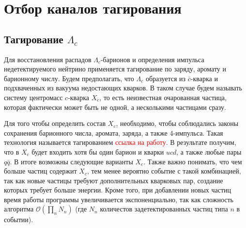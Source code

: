 \section{Отбор каналов тагирования}
\label{taging}
\subsection{Тагирование $\Lambda_c$}

Для восстановления распадов $\Lambda_c$-барионов и определения импульса недетектируемого нейтрино применяется тагирование по заряду, аромату и барионному числу. Будем предполагать, что $\Lambda_c$ образуется из $\bar{c}$-кварка и подхваченных из вакуума недостающих кварков. В таком случае будем называть систему центромасс $c$-кварка $X_c$, то есть неизвестная очарованная частица, которая фактически может быть не одной, а несколькими частицами сразу.

\begin{figure}[h!]
    \centering
\end{figure}

Для того чтобы определить состав $X_c$, необходимо, чтобы соблюдались законы 
сохранения барионного числа, аромата, заряда, а также 4-импульса. Такая 
технология называется тагированием \textcolor{red}{ссылка на работу}. В 
результате получим, что в $X_c$ будет входить хотя бы один барион и кварки 
$u c d$, а также любые пары $q \bar{q}$. В итоге возможны следующие варианты 
$X_c$. Также важно понимать, что чем больше частиц содержит $X_c$, тем менее 
вероятно событие с такой комбинацией, так как новые частицы требуют 
дополнительных кварковых пар, создание которых требует больше энергии. 
Кроме того, при добавлении новых частиц время работы программы увеличивается 
экспоненциально, так как сложность алгоритма $\mathcal{O}(\prod_n N_n)$ 
(где $N_n$ количестов задетектированных частиц типа $n$ в событии).

